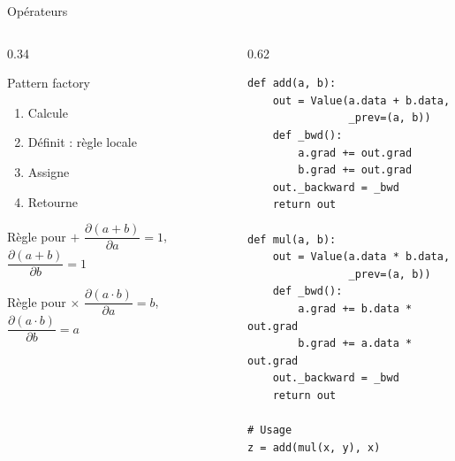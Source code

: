 \documentclass[aspectratio=169, 10pt]{beamer}
\begin{document}
\begin{frame}[fragile]{Opérateurs}
  \begin{columns}[T]
    \begin{column}{0.34\textwidth}
      \begin{block}{Pattern factory}
        \begin{enumerate}\small
          \item Calcule 
          \item Définit  : règle locale
          \item Assigne 
          \item Retourne 
        \end{enumerate}
      \end{block}
      \smallskip
      \begin{alertblock}{Règle pour $+$}
        \small
        $\dfrac{\partial(a+b)}{\partial a} = 1$,\quad $\dfrac{\partial(a+b)}{\partial b} = 1$
      \end{alertblock}
      \smallskip
      \begin{alertblock}{Règle pour $\times$}
        \small
        $\dfrac{\partial(a \cdot b)}{\partial a} = b$,\quad $\dfrac{\partial(a \cdot b)}{\partial b} = a$
      \end{alertblock}
    \end{column}
    \begin{column}{0.62\textwidth}
      \begin{lstlisting}[style=pythonstyle]
def add(a, b):
    out = Value(a.data + b.data,
                _prev=(a, b))
    def _bwd():
        a.grad += out.grad
        b.grad += out.grad
    out._backward = _bwd
    return out

def mul(a, b):
    out = Value(a.data * b.data,
                _prev=(a, b))
    def _bwd():
        a.grad += b.data * out.grad
        b.grad += a.data * out.grad
    out._backward = _bwd
    return out

# Usage
z = add(mul(x, y), x)
      \end{lstlisting}
    \end{column}
  \end{columns}
\end{frame}
\end{document}
